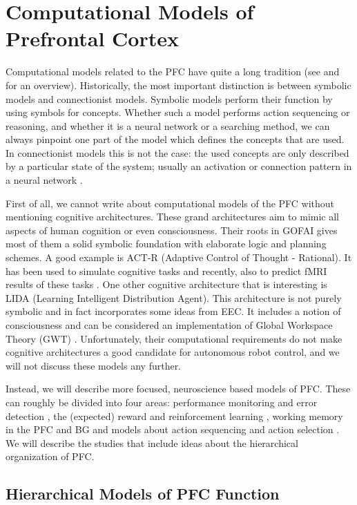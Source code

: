 \documentclass[10pt,a4paper]{report}
\begin{document}
\section{Computational Models of Prefrontal Cortex}

Computational models related to the PFC have quite a long tradition (see \citet{Botvinick2008} and \citet{O'Reilly2010} for an overview). Historically, the most important distinction is between symbolic models and connectionist models. Symbolic models perform their function by using symbols for concepts. Whether such a model performs action sequencing or reasoning, and whether it is a neural network or a searching method, we can always pinpoint one part of the model which defines the concepts that are used. In connectionist models this is not the case: the used concepts are only described by a particular state of the system; usually an activation or connection pattern in a neural network \citep{Rumelhart1986}. 

First of all, we cannot write about computational models of the PFC without mentioning cognitive architectures. These grand architectures aim to mimic all aspects of human cognition or even consciousness. Their roots in GOFAI gives most of them a solid symbolic foundation with elaborate logic and planning schemes. A good example is ACT-R (Adaptive Control of Thought - Rational). It has been used to simulate cognitive tasks and recently, also to predict fMRI results of these tasks \citep{Anderson1997}. One other cognitive architecture that is interesting is LIDA (Learning Intelligent Distribution Agent). This architecture is not purely symbolic and in fact incorporates some ideas from EEC. It includes a notion of consciousness and can be considered an implementation of Global Workspace Theory (GWT) \citep{Baars2009}. Unfortunately, their computational requirements do not make cognitive architectures a good candidate for autonomous robot control, and we will not discuss these models any further. 

Instead, we will describe more focused, neuroscience based models of PFC. These can roughly be divided into four areas: performance monitoring and error detection \citep{Alexander2010}, the (expected) reward and reinforcement learning \citep{O'Doherty2003}, working memory in the PFC and BG \citep{Hazy2007} and models about action sequencing and action selection \citep{Botvinick2008}. We will describe the studies that include ideas about the hierarchical organization of PFC.

\subsection*{Hierarchical Models of PFC Function}
\end{document}
